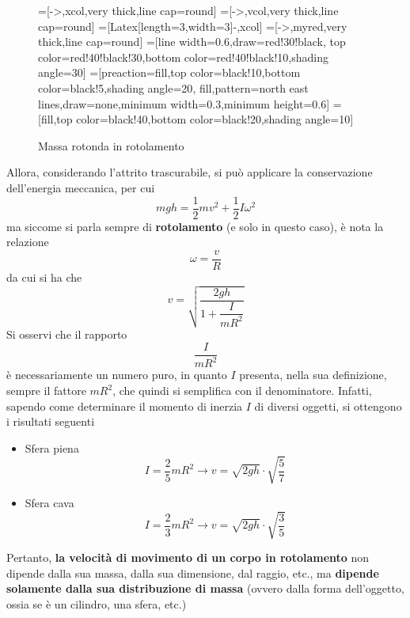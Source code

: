 \documentclass[a4paper]{extarticle}
\begin{document}
\begin{figure}[H]
  \centering
  =[->,xcol,very thick,line cap=round]
  =[->,vcol,very thick,line cap=round]
  =[{Latex[length=3,width=3]}-,xcol]
  =[->,myred,very thick,line cap=round]
  =[line width=0.6,draw=red!30!black, %
                    top color=red!40!black!30,bottom color=red!40!black!10,shading angle=30]
  =[preaction={fill,top color=black!10,bottom color=black!5,shading angle=20},
                      fill,pattern=north east lines,draw=none,minimum width=0.3,minimum height=0.6]
  =[fill,top color=black!40,bottom color=black!20,shading angle=10]
  \caption{Massa rotonda in rotolamento}
  \label{fig:massa_rotonda_rotolamento}
\end{figure}

\noindent
Allora, considerando l'attrito trascurabile, si può applicare la conservazione dell'energia meccanica, per cui
\[mgh=\frac{1}{2}mv^2 + \frac{1}{2}I\omega^2\]
ma siccome si parla sempre di \textbf{rotolamento} (e solo in questo caso), è nota la relazione
\[\omega=\frac{v}{R}\]
da cui si ha che
\[\boxed{v=\sqrt{\frac{2gh}{1 + \dfrac{I}{mR^2}}}}\]
Si osservi che il rapporto
\[\dfrac{I}{mR^2}\]
è necessariamente un numero puro, in quanto $I$ presenta, nella sua definizione, sempre il fattore $mR^2$, che quindi si semplifica con il denominatore. Infatti, sapendo come determinare il momento di inerzia $I$ di diversi oggetti, si ottengono i risultati seguenti
\begin{itemize}
  \item Sfera piena
  \[I=\frac{2}{5}mR^2 \longrightarrow v=\sqrt{2gh} \cdot \sqrt{\frac{5}{7}}\]
  \item Sfera cava
  \[I=\frac{2}{3}mR^2 \longrightarrow v=\sqrt{2gh} \cdot \sqrt{\frac{3}{5}}\]
\end{itemize}
Pertanto, \textbf{la velocità di movimento di un corpo in rotolamento} non dipende dalla sua massa, dalla sua dimensione, dal raggio, etc., ma \textbf{dipende solamente dalla sua distribuzione di massa} (ovvero dalla forma dell'oggetto, ossia se è un cilindro, una sfera, etc.)
\end{document}
